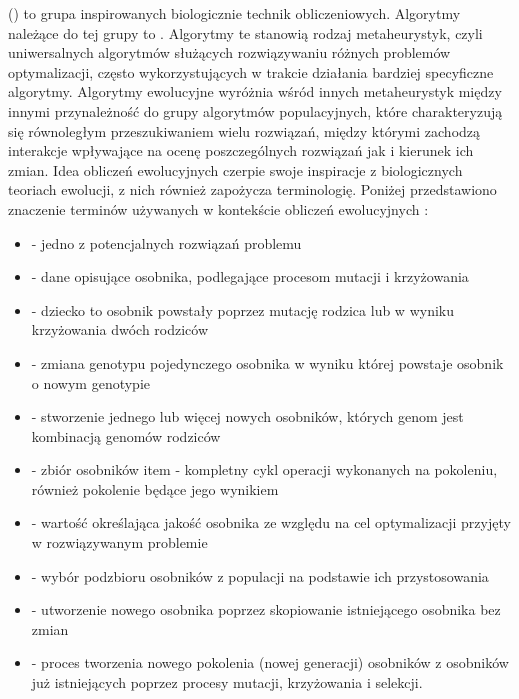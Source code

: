  () to grupa inspirowanych biologicznie technik obliczeniowych. Algorytmy należące do tej grupy to . Algorytmy te stanowią rodzaj metaheurystyk, czyli uniwersalnych algorytmów służących rozwiązywaniu różnych problemów optymalizacji, często wykorzystujących w trakcie działania bardziej specyficzne algorytmy. Algorytmy ewolucyjne wyróżnia wśród innych metaheurystyk między innymi przynależność do grupy algorytmów populacyjnych, które charakteryzują się równoległym przeszukiwaniem wielu rozwiązań, między którymi zachodzą interakcje wpływające na ocenę poszczególnych rozwiązań jak i kierunek ich zmian. Idea obliczeń ewolucyjnych czerpie swoje inspiracje z biologicznych teoriach ewolucji, z nich również zapożycza terminologię. Poniżej przedstawiono znaczenie terminów używanych w kontekście obliczeń ewolucyjnych \cite{Luke2009Metaheuristics}:

\begin{itemize}
	\item {} - jedno z potencjalnych rozwiązań problemu
	\item {} - dane opisujące osobnika, podlegające procesom mutacji i krzyżowania
	\item {} - dziecko to osobnik powstały poprzez mutację rodzica lub w wyniku krzyżowania dwóch rodziców
	\item {} - zmiana genotypu pojedynczego osobnika w wyniku której powstaje osobnik o nowym genotypie
	\item {} - stworzenie jednego lub więcej nowych osobników, których genom jest kombinacją genomów rodziców
	\item {} - zbiór osobników
	item  - kompletny cykl operacji wykonanych na pokoleniu, również pokolenie będące jego wynikiem
	\item {} - wartość określająca jakość osobnika ze względu na cel optymalizacji przyjęty w rozwiązywanym problemie
	\item {} - wybór podzbioru osobników z populacji na podstawie ich przystosowania
	\item {} - utworzenie nowego osobnika poprzez skopiowanie istniejącego osobnika bez zmian
	\item {} - proces tworzenia nowego pokolenia (nowej generacji) osobników z osobników już istniejących poprzez procesy mutacji, krzyżowania i selekcji.
\end{itemize}

